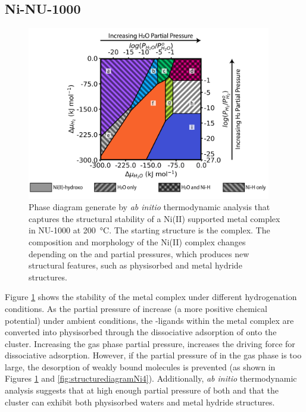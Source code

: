 \documentclass[journal=jctcce,manuscript=article]{achemso}
\begin{document}
\subsection{Ni-NU-1000}
\begin{figure}[H]
    \centering
    \includegraphics[width=0.95\textwidth]{zi-images/01-Ni-Graphics/2020-08-31-Phase-Diagram-V02.png}
    \caption{Phase diagram generate by \textit{ab initio} thermodynamic analysis that captures the structural stability of a Ni(II) supported metal complex in NU-1000 at \SI{200}{\celsius}. The starting structure is the  complex. The composition and morphology of the Ni(II) complex changes depending on the  and  partial pressures, which produces new structural features, such as physisorbed  and metal hydride structures.}
    \label{fig:phasediagramNi4}
\end{figure}

Figure \ref{fig:phasediagramNi4} shows the stability of the  metal complex under different hydrogenation conditions. As the partial pressure of  increase (a more positive chemical potential) under ambient conditions, the -ligands within the  metal complex are converted into physisorbed  through the dissociative adsorption of  onto the cluster. Increasing the gas phase  partial pressure, increases the driving force for dissociative adsorption. However, if the partial pressure of  in the gas phase is too large, the desorption of weakly bound  molecules is prevented (as shown in Figures \ref{fig:phasediagramNi4} and \ref{fig:structurediagramNi4}). Additionally, \textit{ab initio} thermodynamic analysis suggests that at high enough partial pressure of both  and  that the cluster can exhibit both physisorbed waters and metal hydride structures.
 
\end{document}
